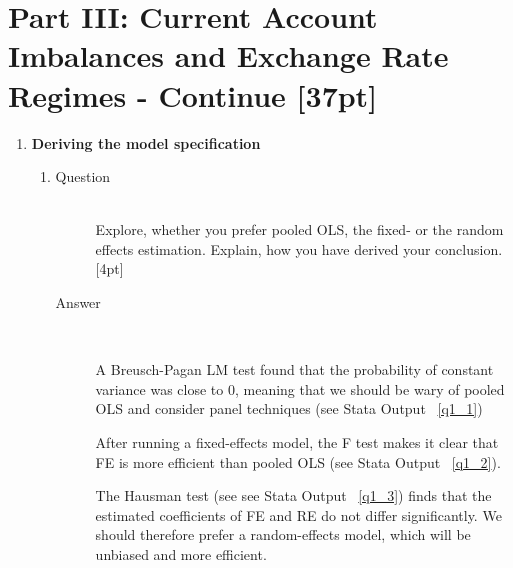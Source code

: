 \documentclass{article}
\begin{document}
\section{Part III: Current Account Imbalances and Exchange Rate Regimes - Continue [37pt]}

\begin{enumerate}
  \item \textbf{Deriving the model specification}
  \begin{enumerate}[label=(\alph*)]
    \item 
    \begin{description}
      \item[Question] \hfill \\
      Explore, whether you prefer pooled OLS, the fixed- or the random effects estimation. Explain, how you have derived your conclusion. [4pt]
      \item[Answer] \hfill \\
      \begin{figure}
      
      \end{figure}
      
      A Breusch-Pagan LM test found that the probability of constant variance was close to 0, meaning that we should be wary of pooled OLS and consider panel techniques (see Stata Output ~\ref{q1_1})
      
      \begin{figure}
      
      \end{figure}
      
      After running a fixed-effects model, the F test makes it clear that FE is more efficient than pooled OLS (see Stata Output ~\ref{q1_2}).
      
      \begin{figure}
      
      \end{figure}
      
      The Hausman test (see see Stata Output ~\ref{q1_3}) finds that the estimated coefficients of FE and RE do not differ significantly. We should therefore prefer a random-effects model, which will be unbiased and more efficient.
      

\end{description}
\end{enumerate}
\end{enumerate}
\end{document}

